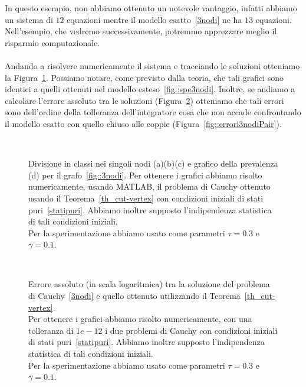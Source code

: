 In questo esempio, non abbiamo ottenuto un notevole vantaggio, infatti abbiamo un sistema di $12$ equazioni mentre il  modello esatto~\eqref{3nodi} ne ha $13$ equazioni. Nell'esempio, che vedremo successivamente, potremmo apprezzare meglio il risparmio computazionale.\\ \\
Andando a risolvere numericamente il sistema e tracciando le soluzioni otteniamo la  Figura~\ref{fig::3nodicut}. Possiamo notare, come previsto dalla teoria, che  tali grafici sono identici a quelli ottenuti nel modello esteso~\ref{fig::spe3nodi}. Inoltre, se andiamo a calcolare l'errore assoluto tra le soluzioni (Figura~\ref{fig::errori3nodi}) otteniamo che tali errori sono dell'ordine della tolleranza dell'integratore cosa che non accade confrontando il modello esatto con quello chiuso alle coppie (Figura~\ref{fig::errori3nodiPair}).
\begin{figure}[!htb]
\centering
\subfloat[][Nodo 1.]{}
\subfloat[][Nodo 2.]{}
\\
\subfloat[][Nodo 3.]{}
\subfloat[][Prevalenza.]{}
\caption[Sperimentazione in MATLAB relativo al grafo~\ref{fig::3nodi}]{Divisione in classi nei singoli nodi (a)(b)(c) e grafico della prevalenza (d) per il grafo~\ref{fig::3nodi}.  Per ottenere i grafici abbiamo risolto numericamente,  usando MATLAB,  il problema di Cauchy ottenuto usando il Teorema~\ref{th_cut-vertex} con condizioni iniziali  di stati puri~\eqref{statipuri}.  Abbiamo inoltre supposto l'indipendenza statistica di tali condizioni iniziali.\\
Per la sperimentazione abbiamo usato come parametri $\tau= 0.3$ e $\gamma =0.1 $.}\label{fig::3nodicut}

\end{figure}
\begin{figure}[!htb]
\centering
\subfloat[][Nodo 1.]
{

}
\subfloat[][Nodo 2.]
{

}
\\
\subfloat[][Nodo 3.]
{

}

\caption[Errori assoluti relativi al grafo~\ref{fig::3nodi} tra modello esatto e cut-vertex] {Errore assoluto (in scala logaritmica) tra la soluzione del problema di Cauchy~\eqref{3nodi} e quello ottenuto utilizzando il Teorema~\ref{th_cut-vertex}.\\
Per ottenere i grafici abbiamo risolto numericamente, con una tolleranza di $1e-12$ i due problemi di Cauchy con condizioni iniziali di stati puri~\eqref{statipuri}. Abbiamo inoltre supposto l'indipendenza statistica di tali condizioni iniziali.\\
Per la sperimentazione abbiamo usato come parametri $\tau = 0.3$ e $\gamma = 0.1$. }
\label{fig::errori3nodi}
\end{figure}

